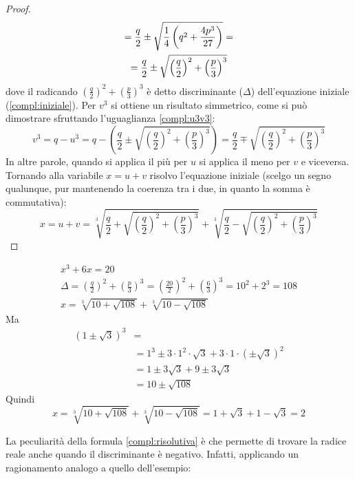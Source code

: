 \begin{proof}
\begin{gather}
		=\frac{q}{2}\pm\sqrt{\frac{1}{4}\left(q^2+\frac{4p^3}{27}\right)}= \notag \\ =\frac{q}{2}\pm\sqrt{\left(\frac{q}{2}\right)^2+\left(\frac{p}{3}\right)^3}
	\end{gather}
	dove il radicando $\left(\frac{q}{2}\right)^2+\left(\frac{p}{3}\right)^3$ è detto discriminante ($\Delta$) dell'equazione iniziale (\ref{compl:iniziale}). Per $v^3$ si ottiene un risultato simmetrico, come si può dimostrare sfruttando l'uguaglianza \ref{compl:u3v3}:
	\[
		v^3 = q - u^3 = q - \left(\frac{q}{2} \pm \sqrt{\left(\frac{q}{2}\right)^2 + \left(\frac{p}{3}\right)^3}\right) = \frac{q}{2} \mp \sqrt{\left(\frac{q}{2}\right)^2 + \left(\frac{p}{3}\right)^3}
	\]
	In altre parole, quando si applica il più per $u$ si applica il meno per $v$ e viceversa. Tornando alla variabile $x=u+v$ risolvo l'equazione iniziale (scelgo un segno qualunque, pur mantenendo la coerenza tra i due, in quanto la somma è commutativa):
	\begin{equation}
		x = u + v = \sqrt[3]{\frac{q}{2} + \sqrt{\left(\frac{q}{2}\right)^2+\left(\frac{p}{3}\right)^3}}+\sqrt[3]{\frac{q}{2}-\sqrt{\left(\frac{q}{2}\right)^2+\left(\frac{p}{3}\right)^3}} \label{compl:risolutiva}
	\end{equation}
\end{proof}
\begin{examp}
	\begin{gather*}
		x^3 + 6x = 20 \\
		\Delta = \left( \frac{q}{2} \right)^2 + \left( \frac{p}{3} \right)^3 = \left( \frac{20}{2} \right)^2 + \left( \frac{6}{3} \right)^3 = 10^2 + 2^3 = 108 \\
		x = \sqrt[3]{10 + \sqrt{108}} + \sqrt[3]{10 - \sqrt{108}}
	\end{gather*}
	Ma
	\begin{align*}
		(1 \pm \sqrt3)^3 & =                                                                     \\
		                 & = 1^3 \pm 3 \cdot 1^2 \cdot \sqrt3 + 3 \cdot 1 \cdot (\pm \sqrt 3 )^2 \\
		                 & = 1 \pm 3 \sqrt 3 + 9 \pm 3 \sqrt 3                                   \\
		                 & = 10 \pm \sqrt{108}
	\end{align*}
	Quindi
	\[
		x=\sqrt[3]{10+\sqrt{108}}+\sqrt[3]{10-\sqrt{108}}=1+\sqrt3+1-\sqrt3=2
	\]
\end{examp}
La peculiarità della formula \ref{compl:risolutiva} è che permette di trovare la radice reale anche quando il discriminante è negativo. Infatti, applicando un ragionamento analogo a quello dell'esempio:
